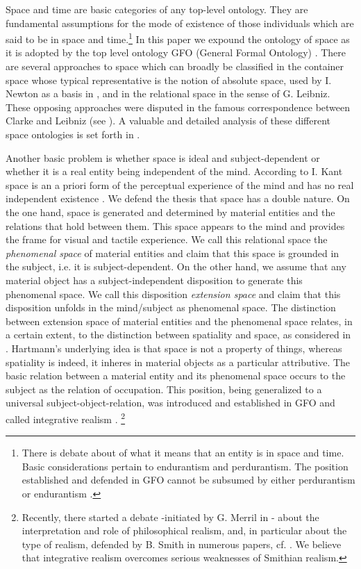 \documentclass{ao2e}
\begin{document}
Space and time are basic categories of any top-level ontology. They are fundamental assumptions for
the mode of existence of those individuals which are said to be in space and time.\footnote{There is debate about 
of what it means that an entity is in space and time. Basic considerations pertain to endurantism and
perdurantism. The position established and defended in GFO cannot be subsumed by either
perdurantism or endurantism \cite{herre-h-2010-a}.}
In this paper we expound the ontology of space as it is adopted by the top level ontology GFO (General Formal Ontology) \cite{herre-h-2010-a}.
There are several approaches
to space which can broadly be classified in the container space whose typical representative is the notion of absolute space, used by I. Newton as a basis in \cite{newton-i-1988-a}, and in the relational space in the sense of G. Leibniz. These opposing approaches were disputed in the famous correspondence between Clarke and Leibniz (see \cite{clarke-s-1990-a}). A valuable and detailed analysis of these different space ontologies is set forth in \cite{johansson-i-1989-a}.

Another basic problem is whether space is ideal and subject-dependent or whether it is  a real entity being independent of the mind.
According to I. Kant space is an a priori form of the perceptual experience of the mind and has no real independent existence \cite{kant-i-1998-a}. We defend the thesis that space has a double nature.
On the one hand, space is generated and determined  by material entities and the relations that hold between them.  This space appears to the mind and provides the frame for visual and tactile experience. We call this relational space the \textit{phenomenal space} of material entities and claim that this space is grounded in the subject, i.e. it is subject-dependent. On the other hand, we assume that any material object has a subject-independent disposition to generate this phenomenal space. We call this disposition \textit{extension space} and claim that this disposition unfolds in the mind/subject as phenomenal space. The distinction between extension space of material entities and the phenomenal space relates, in a certain extent, to the distinction between spatiality
and space, as considered in \cite{hartmann-n-1950-a,hartmann-n-1959-a}.
Hartmann's underlying idea is that space is not a property of things, whereas spatiality
is indeed, it inheres in material objects as a particular attributive.
The basic relation between a material entity and its phenomenal space occurs to the subject as the relation of occupation. This position, being generalized to a universal subject-object-relation,  was introduced and established in GFO and called integrative realism \cite{herre-h-2010-a}. 
\footnote{Recently, there started a debate -initiated by G. Merril in \cite{merril-g-2010-a} - about the interpretation and role of philosophical realism, and, in particular about the type of realism, defended by B. Smith in numerous papers, cf. \cite{smith-b-2004-a,smith-b-2006-a}. We believe that integrative realism  overcomes serious weaknesses of Smithian realism.}
\end{document}
